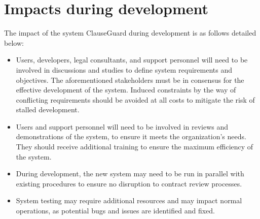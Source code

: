 \section{Impacts during development\label{Section::Impacts During Development}} 
The impact of the system ClauseGuard during development is as follows detailed below: 
\begin{itemize}
    \item Users, developers, legal consultants, and support personnel will need to be involved in discussions and studies to define system requirements and objectives. The aforementioned stakeholders must be in consensus for the effective development of the system. Induced constraints by the way of conflicting requirements should be avoided at all costs to mitigate the risk of stalled development. 
    
    \item Users and support personnel will need to be involved in reviews and demonstrations of the system, to ensure it meets the organization's needs. They should receive additional training to ensure the maximum efficiency of the system. 

    \item During development, the new system may need to be run in parallel with existing procedures to ensure no disruption to contract review processes.



    \item System testing may require additional resources and may impact normal operations, as potential bugs and issues are identified and fixed.







\end{itemize}





